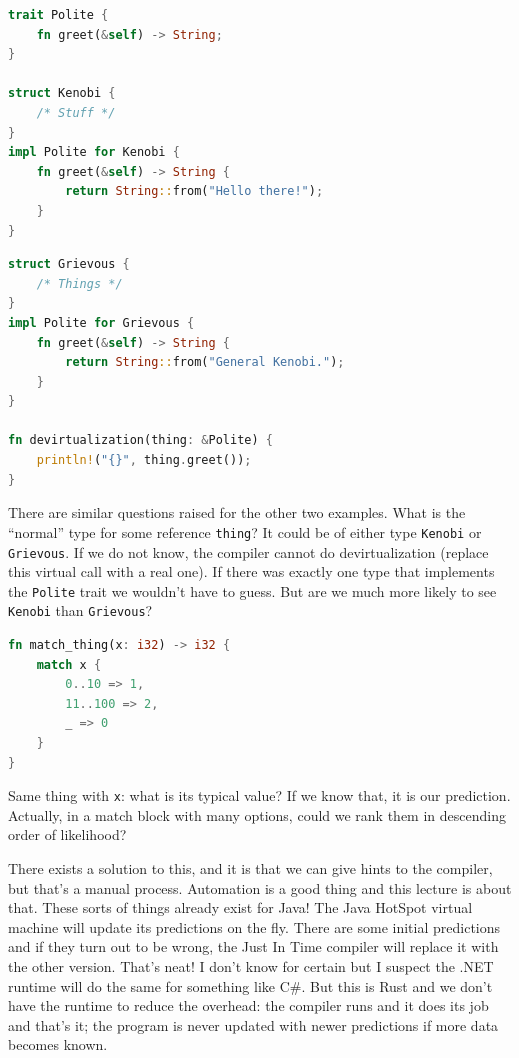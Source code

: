 \documentclass[a4paper]{report}
\begin{document}
\begin{multicols}{2}
\begin{lstlisting}[language=Rust]
trait Polite {
    fn greet(&self) -> String;
}

struct Kenobi {
    /* Stuff */
}
impl Polite for Kenobi {
    fn greet(&self) -> String {
        return String::from("Hello there!");
    }
}
\end{lstlisting}
\columnbreak
\begin{lstlisting}[language=Rust]
struct Grievous {
    /* Things */
}
impl Polite for Grievous {
    fn greet(&self) -> String {
        return String::from("General Kenobi.");
    }
}

fn devirtualization(thing: &Polite) {
    println!("{}", thing.greet());
}

\end{lstlisting}
\end{multicols}



There are similar questions raised for the other two examples. What is the ``normal'' type for some reference \texttt{thing}? It could be of either type \texttt{Kenobi} or \texttt{Grievous}. If we do not know, the compiler cannot do devirtualization (replace this virtual call with a real one). If there was exactly one type that implements the \texttt{Polite} trait we wouldn't have to guess. But are we much more likely to see \texttt{Kenobi} than \texttt{Grievous}?

\begin{lstlisting}[language=Rust]
fn match_thing(x: i32) -> i32 {
    match x {
        0..10 => 1,
        11..100 => 2,
        _ => 0
    }
}
\end{lstlisting}

 Same thing with \texttt{x}: what is its typical value? If we know that, it is our prediction. Actually, in a match block with many options, could we rank them in descending order of likelihood?

There exists a solution to this, and it is that we can give hints to the compiler, but that's a manual process. Automation is a good thing and this lecture is about that. These sorts of things already exist for Java! The Java HotSpot virtual machine will update its predictions on the fly. There are some initial predictions and if they turn out to be wrong, the Just In Time compiler will replace it with the other version. That's neat! I don't know for certain but I suspect the .NET runtime will do the same for something like C\#. But this is Rust and we don't have the runtime to reduce the overhead: the compiler runs and it does its job and that's it; the program is never updated with newer predictions if more data becomes known.
\end{document}
